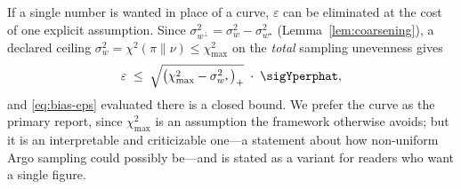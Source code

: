 \begin{remark}
\label{rem:chi2-ceiling}
If a single number is wanted in place of a curve, $\varepsilon$ can be
eliminated at the cost of one explicit assumption. Since
$\sigma_{w^{\perp}}^2=\sigma_w^2-\sigma_{w^{\star}}^2$
(Lemma~\ref{lem:coarsening}), a declared ceiling
$\sigma_w^2=\chi^2(\pi\|\nu)\le\chi^2_{\max}$ on the \emph{total}
sampling unevenness gives
\[
  \varepsilon\;\le\;\sqrt{\big(\chi^2_{\max}-\sigma_{w^{\star}}^2\big)_+}
  \;\cdot\;\sigYperphat ,
\]
and \eqref{eq:bias-eps} evaluated there is a closed bound. We prefer the
curve as the primary report, since $\chi^2_{\max}$ is an assumption the
framework otherwise avoids; but it is an interpretable and criticizable
one---a statement about how non-uniform Argo sampling could possibly
be---and is stated as a variant for readers who want a single figure.
\end{remark}

